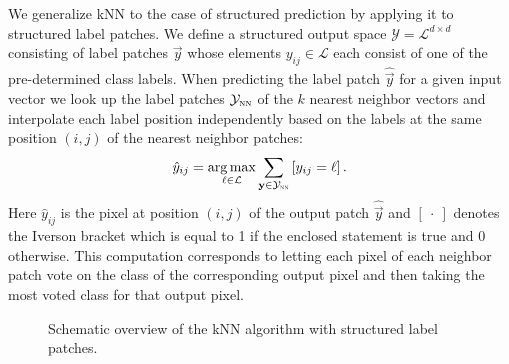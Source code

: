 We generalize \ac{kNN} to the case of structured prediction by applying it to structured label patches. %
We define a structured output space $\mathcal{Y} = \mathcal{L}^{d \times d}$ consisting of label patches $\vec{y}$ whose elements $y_{ij} \in \mathcal{L}$ each consist of one of the pre-determined class labels. When predicting the label patch $\hat{\vec{y}}$ for a given input vector we look up the label patches $\mathcal{Y}_\textsc{nn}$ of the $k$ nearest neighbor vectors  and interpolate each label position independently based on the labels at the same position $(i,j)$ of the nearest neighbor patches:
\begin{equation}
\hat{y}_{ij} = \operatorname*{arg\,max}_{\ell \in \mathcal{L}} \sum_{\mathbf{y} \in \mathcal{Y}_\textsc{nn}} \left[ y_{ij} = \ell \right ].
\label{eq:nn_decision_rule}
\end{equation}
Here $\hat{y}_{ij}$ is the pixel at position $(i,j)$ of the output patch $\hat{\vec{y}}$ and $\left [\ \cdot \ \right ]$ denotes the Iverson bracket which is equal to 1 if the enclosed statement is true and 0 otherwise. This computation corresponds to letting each pixel of each neighbor patch vote on the class of the corresponding output pixel and then taking the most voted class for that output pixel.

\begin{figure}[tbh]
\begin{center}
\caption{Schematic overview of the \ac{kNN} algorithm with structured label patches. }
\label{fig:knn_segmentation}
\end{center}
\end{figure}

